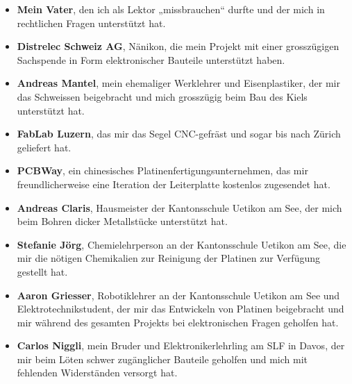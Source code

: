 \begin{itemize}
    \item \textbf{Mein Vater}, den ich als Lektor „missbrauchen“ durfte und der mich in rechtlichen Fragen unterstützt hat.

    \item \textbf{Distrelec Schweiz AG}, Nänikon, die mein Projekt mit einer grosszügigen Sachspende in Form elektronischer Bauteile unterstützt haben.

    \item \textbf{Andreas Mantel}, mein ehemaliger Werklehrer und Eisenplastiker, der mir das Schweissen beigebracht und mich grosszügig beim Bau des Kiels unterstützt hat.

    \item \textbf{FabLab Luzern}, das mir das Segel CNC-gefräst und sogar bis nach Zürich geliefert hat.

    \item \textbf{PCBWay}, ein chinesisches Platinenfertigungsunternehmen, das mir freundlicherweise eine Iteration der Leiterplatte kostenlos zugesendet hat.

    \item \textbf{Andreas Claris}, Hausmeister der Kantonsschule Uetikon am See, der mich beim Bohren dicker Metallstücke unterstützt hat.

    \item \textbf{Stefanie Jörg}, Chemielehrperson an der Kantonsschule Uetikon am See, die mir die nötigen Chemikalien zur Reinigung der Platinen zur Verfügung gestellt hat.

    \item \textbf{Aaron Griesser}, Robotiklehrer an der Kantonsschule Uetikon am See und Elektrotechnikstudent, der mir das Entwickeln von Platinen beigebracht und mir während des gesamten Projekts bei elektronischen Fragen geholfen hat.

    \item \textbf{Carlos Niggli}, mein Bruder und Elektronikerlehrling am SLF in Davos, der mir beim Löten schwer zugänglicher Bauteile geholfen und mich mit fehlenden Widerständen versorgt hat.
\end{itemize}